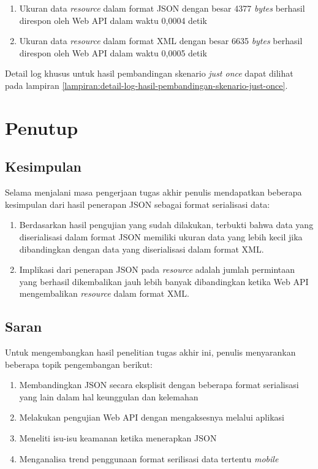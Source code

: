 \documentclass[a4paper, 12pt, oneside]{report}
\begin{document}
\begin{enumerate}
  \item Ukuran data \textit{resource} dalam format JSON dengan besar 4377 \textit{bytes} berhasil direspon oleh Web API dalam waktu 0,0004 detik
  \item Ukuran data \textit{resource} dalam format XML dengan besar 6635 \textit{bytes} berhasil direspon oleh Web API dalam waktu 0,0005 detik
\end{enumerate}

Detail log khusus untuk hasil pembandingan skenario \textit{just once} dapat dilihat pada lampiran \ref{lampiran:detail-log-hasil-pembandingan-skenario-just-once}.

\chapter{Penutup}

\section{Kesimpulan}

Selama menjalani masa pengerjaan tugas akhir penulis mendapatkan beberapa kesimpulan dari hasil penerapan JSON sebagai format serialisasi data:

\begin{enumerate}
  \item Berdasarkan hasil pengujian yang sudah dilakukan, terbukti bahwa data yang diserialisasi dalam format JSON memiliki ukuran data yang lebih kecil jika dibandingkan dengan data yang diserialisasi dalam format XML.
  \item Implikasi dari penerapan JSON pada \textit{resource} adalah jumlah permintaan yang berhasil dikembalikan jauh lebih banyak dibandingkan ketika Web API mengembalikan \textit{resource} dalam format XML.
\end{enumerate}

\section{Saran}

Untuk mengembangkan hasil penelitian tugas akhir ini, penulis menyarankan beberapa topik pengembangan berikut:

\begin{enumerate}
  \item Membandingkan JSON secara eksplisit dengan beberapa format serialisasi yang lain dalam hal keunggulan dan kelemahan
  \item Melakukan pengujian Web API dengan mengaksesnya melalui aplikasi
  \item Meneliti isu-isu keamanan ketika menerapkan JSON
  \item Menganalisa trend penggunaan format serilisasi data tertentu  
  \textit{mobile}
\end{enumerate}
\end{document}
